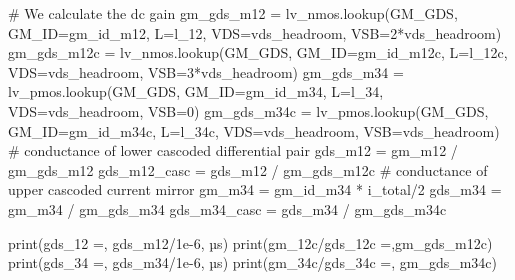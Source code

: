 \documentclass[
  a4paper,
  DIV=11,
  numbers=noendperiod]{scrartcl}
\newenvironment{Shaded}{\begin{snugshade}}{\end{snugshade}}
\newcommand{\BuiltInTok}[1]{\textcolor[rgb]{0.00,0.23,0.31}{#1}}
\newcommand{\CommentTok}[1]{\textcolor[rgb]{0.37,0.37,0.37}{#1}}
\newcommand{\DecValTok}[1]{\textcolor[rgb]{0.68,0.00,0.00}{#1}}
\newcommand{\FloatTok}[1]{\textcolor[rgb]{0.68,0.00,0.00}{#1}}
\newcommand{\NormalTok}[1]{\textcolor[rgb]{0.00,0.23,0.31}{#1}}
\newcommand{\OperatorTok}[1]{\textcolor[rgb]{0.37,0.37,0.37}{#1}}
\newcommand{\StringTok}[1]{\textcolor[rgb]{0.13,0.47,0.30}{#1}}
\begin{document}
\begin{tcolorbox}
\begin{Shaded}
\begin{Highlighting}[]
\CommentTok{\# We calculate the dc gain}
\NormalTok{gm\_gds\_m12 }\OperatorTok{=}\NormalTok{ lv\_nmos.lookup(}\StringTok{\textquotesingle{}GM\_GDS\textquotesingle{}}\NormalTok{, GM\_ID}\OperatorTok{=}\NormalTok{gm\_id\_m12, L}\OperatorTok{=}\NormalTok{l\_12, VDS}\OperatorTok{=}\NormalTok{vds\_headroom, VSB}\OperatorTok{=}\DecValTok{2}\OperatorTok{*}\NormalTok{vds\_headroom)}
\NormalTok{gm\_gds\_m12c }\OperatorTok{=}\NormalTok{ lv\_nmos.lookup(}\StringTok{\textquotesingle{}GM\_GDS\textquotesingle{}}\NormalTok{, GM\_ID}\OperatorTok{=}\NormalTok{gm\_id\_m12c, L}\OperatorTok{=}\NormalTok{l\_12c, VDS}\OperatorTok{=}\NormalTok{vds\_headroom, VSB}\OperatorTok{=}\DecValTok{3}\OperatorTok{*}\NormalTok{vds\_headroom)}
\NormalTok{gm\_gds\_m34 }\OperatorTok{=}\NormalTok{ lv\_pmos.lookup(}\StringTok{\textquotesingle{}GM\_GDS\textquotesingle{}}\NormalTok{, GM\_ID}\OperatorTok{=}\NormalTok{gm\_id\_m34, L}\OperatorTok{=}\NormalTok{l\_34, VDS}\OperatorTok{=}\NormalTok{vds\_headroom, VSB}\OperatorTok{=}\DecValTok{0}\NormalTok{)}
\NormalTok{gm\_gds\_m34c }\OperatorTok{=}\NormalTok{ lv\_pmos.lookup(}\StringTok{\textquotesingle{}GM\_GDS\textquotesingle{}}\NormalTok{, GM\_ID}\OperatorTok{=}\NormalTok{gm\_id\_m34c, L}\OperatorTok{=}\NormalTok{l\_34c, VDS}\OperatorTok{=}\NormalTok{vds\_headroom, VSB}\OperatorTok{=}\NormalTok{vds\_headroom)}
\CommentTok{\# conductance of lower cascoded differential pair}
\NormalTok{gds\_m12 }\OperatorTok{=}\NormalTok{ gm\_m12 }\OperatorTok{/}\NormalTok{ gm\_gds\_m12}
\NormalTok{gds\_m12\_casc }\OperatorTok{=}\NormalTok{ gds\_m12 }\OperatorTok{/}\NormalTok{ gm\_gds\_m12c}
\CommentTok{\# conductance of upper cascoded current mirror}
\NormalTok{gm\_m34 }\OperatorTok{=}\NormalTok{ gm\_id\_m34 }\OperatorTok{*}\NormalTok{ i\_total}\OperatorTok{/}\DecValTok{2}
\NormalTok{gds\_m34 }\OperatorTok{=}\NormalTok{ gm\_m34 }\OperatorTok{/}\NormalTok{ gm\_gds\_m34}
\NormalTok{gds\_m34\_casc }\OperatorTok{=}\NormalTok{ gds\_m34 }\OperatorTok{/}\NormalTok{ gm\_gds\_m34c}

\BuiltInTok{print}\NormalTok{(}\StringTok{\textquotesingle{}gds\_12 =\textquotesingle{}}\NormalTok{, gds\_m12}\OperatorTok{/}\FloatTok{1e{-}6}\NormalTok{, }\StringTok{\textquotesingle{}µs\textquotesingle{}}\NormalTok{)}
\BuiltInTok{print}\NormalTok{(}\StringTok{\textquotesingle{}gm\_12c/gds\_12c =\textquotesingle{}}\NormalTok{,gm\_gds\_m12c)}
\BuiltInTok{print}\NormalTok{(}\StringTok{\textquotesingle{}gds\_34 =\textquotesingle{}}\NormalTok{, gds\_m34}\OperatorTok{/}\FloatTok{1e{-}6}\NormalTok{, }\StringTok{\textquotesingle{}µs\textquotesingle{}}\NormalTok{)}
\BuiltInTok{print}\NormalTok{(}\StringTok{\textquotesingle{}gm\_34c/gds\_34c =\textquotesingle{}}\NormalTok{, gm\_gds\_m34c)}


\end{Highlighting}
\end{Shaded}
\end{tcolorbox}
\end{document}
